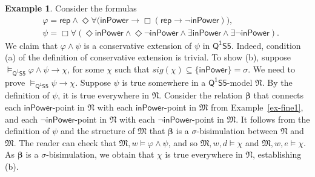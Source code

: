 \documentclass[10pt,a4paper]{amsart}
\theoremstyle{plain}
\theoremstyle{definition}
\newtheorem{exa}[thm]{Example}
\newcommand{\nb}[1]{\textcolor{red}{\bf!}%
	\marginpar[\parbox{15mm}{\raggedleft\scriptsize\textcolor{red}{#1}}]%
	{\parbox{15mm}{\raggedright\scriptsize\textcolor{red}{#1}}}}
\newcommand{\sig}{\mathit{sig}}
\newcommand{\FOMS}{\ensuremath{\mathsf{Q^1S5}}}
\newcommand{\bs}{\boldsymbol{\beta}}
\begin{document}
\begin{exa}\label{example9} 
Consider the formulas
%
\begin{align*}
&\varphi = \mathsf{rep} \wedge \Diamond \forall  \big(\mathsf{inPower} \rightarrow \Box (\mathsf{rep} \rightarrow \neg \mathsf{inPower}) \big),\\
%
& \psi = \Box \forall (\Diamond \mathsf{inPower} \wedge \Diamond \neg \mathsf{inPower} \wedge \exists \mathsf{inPower} \wedge \exists \neg \mathsf{inPower}). 
\end{align*}
%
We claim that $\varphi \wedge \psi$ is a conservative extension of $\psi$ in $\FOMS$.  %
%
%
Indeed, condition (a) of the definition of conservative extension is trivial. To show (b), suppose $\models_{\FOMS} \varphi \land \psi \to \chi$, for some $\chi$ such that $\sig(\chi) \subseteq \{\mathsf{inPower}\} = \sigma$. We need to prove $\models_{\FOMS} \psi \to \chi$. Suppose $\psi$ is true somewhere in a \FOMS-model $\mathfrak N$. By the definition of $\psi$, it is true everywhere in $\mathfrak N$. Consider the relation $\bs$ that connects each $\mathsf{inPower}$-point in $\mathfrak N$ with each $\mathsf{inPower}$-point in $\mathfrak M$ from Example~\ref{ex-fine1}, and each $\neg\mathsf{inPower}$-point in $\mathfrak N$ with each $\neg\mathsf{inPower}$-point in $\mathfrak M$. It follows from the definition of $\psi$ and the structure of $\mathfrak M$ that $\bs$ is a $\sigma$-bisimulation between $\mathfrak N$ and $\mathfrak M$. The reader can check that $\mathfrak M,w \models \varphi \land \psi$, and so $\mathfrak M,w,d \models \chi$ and $\mathfrak M,w,e \models \chi$. As $\bs$ is a $\sigma$-bisimulation, we obtain that $\chi$ is true everywhere in $\mathfrak N$, establishing (b).


\end{exa}
\end{document}
